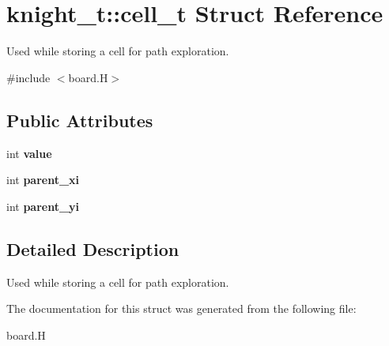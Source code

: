 \hypertarget{structknight__t_1_1cell__t}{\section{knight\-\_\-t\-:\-:cell\-\_\-t \-Struct \-Reference}
\label{structknight__t_1_1cell__t}
}


\-Used while storing a cell for path exploration.  




{\ttfamily \#include $<$board.\-H$>$}

\subsection*{\-Public \-Attributes}
\begin{DoxyCompactItemize}
\item 
\hypertarget{structknight__t_1_1cell__t_a0275a8df953b3d6fa3800c77f04bb9bb}{int {\bfseries value}}\label{structknight__t_1_1cell__t_a0275a8df953b3d6fa3800c77f04bb9bb}

\item 
\hypertarget{structknight__t_1_1cell__t_a2e51aa9c48e8f88fcc9b5bd202757e9b}{int {\bfseries parent\-\_\-xi}}\label{structknight__t_1_1cell__t_a2e51aa9c48e8f88fcc9b5bd202757e9b}

\item 
\hypertarget{structknight__t_1_1cell__t_ad85674b15610d330ab4b80014f7d0736}{int {\bfseries parent\-\_\-yi}}\label{structknight__t_1_1cell__t_ad85674b15610d330ab4b80014f7d0736}

\end{DoxyCompactItemize}


\subsection{\-Detailed \-Description}
\-Used while storing a cell for path exploration. 

\-The documentation for this struct was generated from the following file\-:\begin{DoxyCompactItemize}
\item 
board.\-H\end{DoxyCompactItemize}
